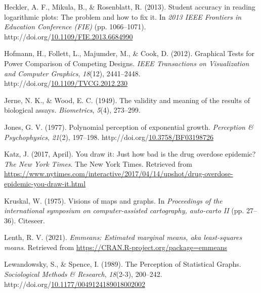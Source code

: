 \documentclass[print]{nuthesis}
\newlength{\cslhangindent}
\newenvironment{CSLReferences}%
{\setlength{\parindent}{0pt}%
\everypar{\setlength{\hangindent}{\cslhangindent}}\ignorespaces}%
{\par}
\begin{document}
\begin{CSLReferences}{1}{0}
\leavevmode{}%
Heckler, A. F., Mikula, B., \& Rosenblatt, R. (2013). Student accuracy in reading logarithmic plots: {The} problem and how to fix it. In \emph{2013 {IEEE} {Frontiers} in {Education} {Conference} ({FIE})} (pp. 1066--1071). http://doi.org/\href{https://doi.org/10.1109/FIE.2013.6684990}{10.1109/FIE.2013.6684990}

\leavevmode{}%
Hofmann, H., Follett, L., Majumder, M., \& Cook, D. (2012). Graphical {Tests} for {Power} {Comparison} of {Competing} {Designs}. \emph{IEEE Transactions on Visualization and Computer Graphics}, \emph{18}(12), 2441--2448. http://doi.org/\href{https://doi.org/10.1109/TVCG.2012.230}{10.1109/TVCG.2012.230}

\leavevmode{}%
Jerne, N. K., \& Wood, E. C. (1949). The validity and meaning of the results of biological assays. \emph{Biometrics}, \emph{5}(4), 273--299.

\leavevmode{}%
Jones, G. V. (1977). Polynomial perception of exponential growth. \emph{Perception \& Psychophysics}, \emph{21}(2), 197--198. http://doi.org/\href{https://doi.org/10.3758/BF03198726}{10.3758/BF03198726}

\leavevmode{}%
Katz, J. (2017, April). You draw it: Just how bad is the drug overdose epidemic? \emph{The New York Times}. The New York Times. Retrieved from \url{https://www.nytimes.com/interactive/2017/04/14/upshot/drug-overdose-epidemic-you-draw-it.html}

\leavevmode{}%
Kruskal, W. (1975). Visions of maps and graphs. In \emph{Proceedings of the international symposium on computer-assisted cartography, auto-carto II} (pp. 27--36). Citeseer.

\leavevmode{}%
Lenth, R. V. (2021). \emph{Emmeans: Estimated marginal means, aka least-squares means}. Retrieved from \url{https://CRAN.R-project.org/package=emmeans}

\leavevmode{}%
Lewandowsky, S., \& Spence, I. (1989). The {Perception} of {Statistical} {Graphs}. \emph{Sociological Methods \& Research}, \emph{18}(2-3), 200--242. http://doi.org/\href{https://doi.org/10.1177/0049124189018002002}{10.1177/0049124189018002002}


\end{CSLReferences}
\end{document}
